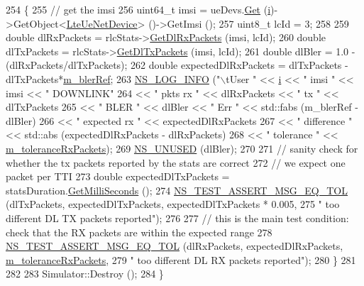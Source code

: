 \begin{DoxyCode}
254     \{
255       \textcolor{comment}{// get the imsi}
256       uint64\_t imsi = ueDevs.\hyperlink{classns3_1_1NetDeviceContainer_a677d62594b5c9d2dea155cc5045f4d0b}{Get} (\hyperlink{bernuolliDistribution_8m_a6f6ccfcf58b31cb6412107d9d5281426}{i})->GetObject<\hyperlink{classns3_1_1LteUeNetDevice}{LteUeNetDevice}> ()->GetImsi ();
257       uint8\_t lcId = 3;
258 
259       \textcolor{keywordtype}{double} dlRxPackets = rlcStats->\hyperlink{classns3_1_1RadioBearerStatsCalculator_a164d36dc82ed7dae2f4d748da502589a}{GetDlRxPackets} (imsi, lcId);
260       \textcolor{keywordtype}{double} dlTxPackets = rlcStats->\hyperlink{classns3_1_1RadioBearerStatsCalculator_a55f9b9c664e1389ad9edf704e385299c}{GetDlTxPackets} (imsi, lcId);
261       \textcolor{keywordtype}{double} dlBler =  1.0 - (dlRxPackets/dlTxPackets);
262       \textcolor{keywordtype}{double} expectedDlRxPackets = dlTxPackets -dlTxPackets*\hyperlink{classLenaDataPhyErrorModelTestCase_ae71840486376fab393228e5cd12b46ca}{m\_blerRef};
263       \hyperlink{group__logging_gafbd73ee2cf9f26b319f49086d8e860fb}{NS\_LOG\_INFO} (\textcolor{stringliteral}{"\(\backslash\)tUser "} << \hyperlink{bernuolliDistribution_8m_a6f6ccfcf58b31cb6412107d9d5281426}{i} << \textcolor{stringliteral}{" imsi "} << imsi << \textcolor{stringliteral}{" DOWNLINK"}
264                    << \textcolor{stringliteral}{" pkts rx "} << dlRxPackets << \textcolor{stringliteral}{" tx "} << dlTxPackets
265                    << \textcolor{stringliteral}{" BLER "} << dlBler << \textcolor{stringliteral}{" Err "} << std::fabs (m\_blerRef - dlBler)
266                    << \textcolor{stringliteral}{" expected rx "} << expectedDlRxPackets
267                    << \textcolor{stringliteral}{" difference "} << std::abs (expectedDlRxPackets - dlRxPackets)
268                    << \textcolor{stringliteral}{" tolerance "} << \hyperlink{classLenaDataPhyErrorModelTestCase_aee9e59c87518a69c4a4e9359af2bbc96}{m\_toleranceRxPackets});
269       \hyperlink{unused_8h_a3ba03ad859378e9f01285afb60f0e3ab}{NS\_UNUSED} (dlBler);
270 
271       \textcolor{comment}{// sanity check for whether the tx packets reported by the stats are correct}
272       \textcolor{comment}{// we expect one packet per TTI}
273       \textcolor{keywordtype}{double} expectedDlTxPackets = statsDuration.\hyperlink{classns3_1_1Time_aba3428a8b6c4c8d9014ce44145081f34}{GetMilliSeconds} ();
274       \hyperlink{group__testing_ga9e7861b56b4e70db3b56044cb7a28e41}{NS\_TEST\_ASSERT\_MSG\_EQ\_TOL} (dlTxPackets, expectedDlTxPackets, 
      expectedDlTxPackets * 0.005, 
275                                  \textcolor{stringliteral}{" too different DL TX packets reported"});
276 
277       \textcolor{comment}{// this is the main test condition: check that the RX packets are within the expected range}
278       \hyperlink{group__testing_ga9e7861b56b4e70db3b56044cb7a28e41}{NS\_TEST\_ASSERT\_MSG\_EQ\_TOL} (dlRxPackets, expectedDlRxPackets, 
      \hyperlink{classLenaDataPhyErrorModelTestCase_aee9e59c87518a69c4a4e9359af2bbc96}{m\_toleranceRxPackets}, 
279                                  \textcolor{stringliteral}{" too different DL RX packets reported"});
280     \}
281 
282 
283   Simulator::Destroy ();
284 \}
\end{DoxyCode}


